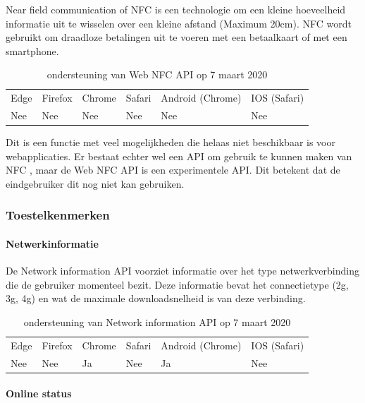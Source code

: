 Near field communication of NFC is een technologie om een kleine hoeveelheid informatie uit te wisselen over een kleine afstand (Maximum 20cm). NFC wordt gebruikt om draadloze betalingen uit te voeren met een betaalkaart of met een smartphone. 
\autocite{Paus2007}

\begin{table}[H]
	\centering
	\begin{tabular}{llllll}
		Edge & Firefox & Chrome & Safari & Android (Chrome) & IOS (Safari) \\
		Nee   & Nee      &  Nee     & Nee     & Nee               & Nee          
	\end{tabular}	
	\caption{ondersteuning van Web NFC API op 7 maart 2020}
\end{table}

Dit is een functie met veel mogelijkheden die helaas niet beschikbaar is voor webapplicaties.
Er bestaat echter wel een API om gebruik te kunnen maken van NFC \autocite{RohdeChristiansen2020}, maar de Web NFC API is een experimentele API. Dit betekent dat de eindgebruiker dit nog niet kan gebruiken.



\subsubsection{Toestelkenmerken}


\paragraph{Netwerkinformatie}

De Network information API \autocite{Lamouri2014} voorziet informatie over het type netwerkverbinding die de gebruiker momenteel bezit. Deze informatie bevat het connectietype (2g, 3g, 4g) en wat de maximale downloadsnelheid is van deze verbinding.

\begin{table}[H]
	\centering
	\begin{tabular}{llllll}
		Edge & Firefox & Chrome & Safari & Android (Chrome) & IOS (Safari) \\
		Nee   & Nee      &  Ja     & Nee     & Ja               & Nee          
	\end{tabular}	
	\caption{ondersteuning van Network information API op 7 maart 2020}
\end{table}

\paragraph{Online status}

